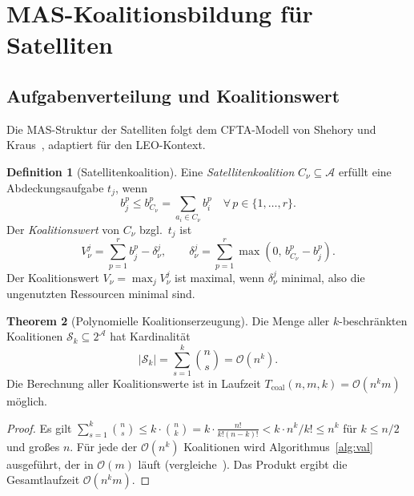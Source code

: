 ﻿\documentclass[a4paper,12pt]{article}
\theoremstyle{definition}
\newtheorem{definition}{Definition}[section]
\newtheorem{theorem}[definition]{Theorem}
\newcommand{\calA}{\mathcal{A}}
\newcommand{\calS}{\mathcal{S}}
\begin{document}
\section{MAS-Koalitionsbildung f\"ur Satelliten}
\label{sec:cfta}

\subsection{Aufgabenverteilung und Koalitionswert}

Die MAS-Struktur der Satelliten folgt dem CFTA-Modell von Shehory und
Kraus~\cite{SK98}, adaptiert f\"ur den LEO-Kontext.

\begin{definition}[Satellitenkoalition]
Eine \emph{Satellitenkoalition} $C_\nu \subseteq \calA$ erf\"ullt eine
Abdeckungsaufgabe $t_j$, wenn
\begin{equation}
  b_j^p \leq b_{C_\nu}^p = \sum_{a_i \in C_\nu} b_i^p
  \quad \forall\, p \in \{1,\ldots,r\}.
  \label{eq:feasible}
\end{equation}
Der \emph{Koalitionswert} von $C_\nu$ bzgl.\ $t_j$ ist
\begin{equation}
  V_\nu^j = \sum_{p=1}^r b_j^p - \delta_\nu^j,
  \qquad \delta_\nu^j = \sum_{p=1}^r \max(0,\, b_{C_\nu}^p - b_j^p).
  \label{eq:coalition_value}
\end{equation}
Der Koalitionswert $V_\nu = \max_j V_\nu^j$ ist maximal, wenn
$\delta_\nu^j$ minimal, also die ungenutzten Ressourcen minimal sind.
\end{definition}

\begin{theorem}[Polynomielle Koalitionserzeugung]
\label{thm:poly_coal}
Die Menge aller $k$-beschr\"ankten Koalitionen $\calS_k \subseteq 2^{\calA}$
hat Kardinalit\"at
\begin{equation}
  |\calS_k| = \sum_{s=1}^k \binom{n}{s} = \mathcal{O}(n^k).
  \label{eq:coal_count}
\end{equation}
Die Berechnung aller Koalitionswerte ist in Laufzeit
$T_{\mathrm{coal}}(n,m,k) = \mathcal{O}(n^k m)$ m\"oglich.
\end{theorem}

\begin{proof}
Es gilt
$\sum_{s=1}^k \binom{n}{s} \leq k \cdot \binom{n}{k}
= k \cdot \frac{n!}{k!(n-k)!} < k \cdot n^k / k! \leq n^k$
f\"ur $k \leq n/2$ und gro\ss{}es $n$.
F\"ur jede der $\mathcal{O}(n^k)$ Koalitionen wird Algorithmus~\ref{alg:val}
ausgef\"uhrt, der in $\mathcal{O}(m)$ l\"auft (vergleiche~\cite{SK95}).
Das Produkt ergibt die Gesamtlaufzeit $\mathcal{O}(n^k m)$.
\end{proof}
\end{document}
